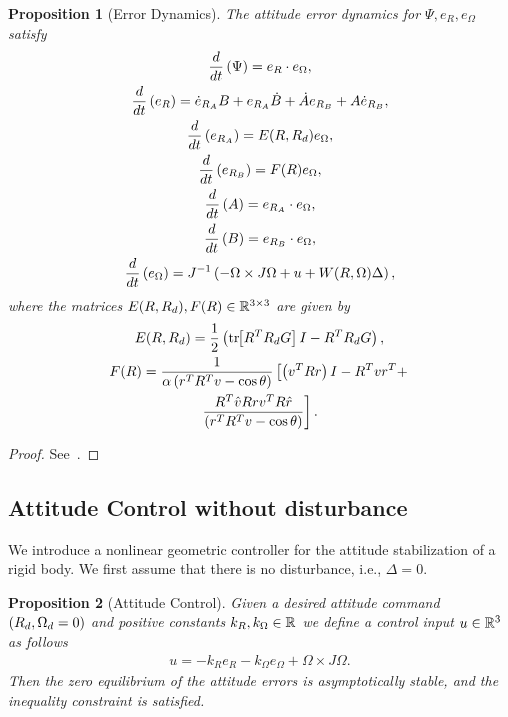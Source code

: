 \documentclass[letterpaper, 10 pt, conference]{ieeeconf}  %
\newtheorem{prop}{Proposition}
\begin{document}
\begin{prop}[Error Dynamics]\label{prop:error_dyn}
	The attitude error dynamics for \( \Psi, e_R, e_\Omega \) satisfy 
	\begin{gather}
		\frac{d }{d t} \left( \Psi \right) = e_R \cdot e_\Omega , \label{eqn:psi_dot}\\
		\frac{d }{d t} \left( e_R \right) = \dot{e}_{R_A} B + e_{R_A} \dot{B} + \dot{A}e_{R_B} + A \dot{e}_{R_B} , \label{eqn:eR_dot}\\
		\frac{d }{d t} \left( e_{R_A} \right) = E(R, R_d) e_\Omega , \label{eqn:eRA_dot} \\
		\frac{d }{d t} \left( e_{R_B} \right) = F(R) e_\Omega , \label{eqn:eRB_dot} \\
		\frac{d }{d t} \left( A \right) = e_{R_A} \cdot e_\Omega , \label{eqn:A_dot} \\
		\frac{d }{d t} \left( B \right) = e_{R_B} \cdot e_\Omega , \label{eqn:B_dot} \\
		\frac{d }{d t} \left( e_\Omega \right) = J^{-1} \left( -\Omega \times J \Omega + u + W(R, \Omega) \Delta \right) , \label{eqn:eW_dot}
	\end{gather}
	where the matrices \(E(R,R_d), F(R) \in \mathbb{R}^{3\times3} \) are given by
	\begin{gather}
		E(R,R_d) = \frac{1}{2} \left( \mathrm{tr}\negthickspace\left[ R^T R_d G \right]I - R^T R_d G \right) , \label{eqn:E} \\
		F(R) = \frac{1}{\alpha \left( r^T R^T v - \cos \theta \right)} \left[\left( v^T R r \right) I - R^T v r^T + \right. \nonumber \\
		\left. \frac{R^T \hat{v} R r v^T R \hat{r}}{\left( r^T R^T v - \cos \theta \right)}\right] . \label{eqn:F}
	\end{gather}
\end{prop}
\begin{proof}
See~.
\end{proof}

\subsection{Attitude Control without disturbance}
We introduce a nonlinear geometric controller for the attitude stabilization of a rigid body.
We first assume that there is no disturbance, i.e., \( \Delta = 0 \).
\begin{prop}[Attitude Control]\label{prop:att_control}
	Given a desired attitude command \( \left( R_d, \Omega_d = 0 \right) \) and positive constants \( k_R, k_\Omega \in \mathbb{R} \) we define a control input \( u \in \mathbb{R}^3 \) as follows
	\begin{gather}
		u = -k_R e_R - k_\Omega e_\Omega + \Omega \times J \Omega . \label{eqn:nodist_control}
	\end{gather}
	Then the zero equilibrium of the attitude errors is asymptotically stable, and the inequality constraint is satisfied.
\end{prop}
\end{document}

